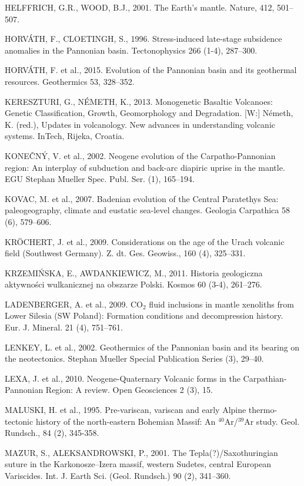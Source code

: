 \documentclass[11.5pt,twoside]{report}
\begin{document}
\begin{multicols}{3}
\uppercase{Helffrich, G.R., Wood, B.J.}, 2001. The Earth's mantle. Nature, 412, 501–507.

\uppercase{Horv\'{A}th, F., Cloetingh, S., 1996.} Stress-induced late-stage subsidence anomalies in the Pannonian basin. Tectonophysics 266 (1-4), 287–300.

\uppercase{Horv\'{A}th, F.} et al., 2015. Evolution of the Pannonian basin and its geothermal resources. Geothermics 53, 328–352. 

\uppercase{Kereszturi, G., N\'{E}meth, K., 2013.} Monogenetic Basaltic Volcanoes: Genetic Classification, Growth, Geomorphology and Degradation. [W:] Németh, K. (red.), Updates in volcanology. New advances in understanding volcanic systems. InTech, Rijeka, Croatia.

\uppercase{Konečný, V.} et al., 2002. Neogene evolution of the Carpatho-Pannonian region: An interplay of subduction and back-arc diapiric uprise in the mantle. EGU Stephan Mueller Spec. Publ. Ser. (1), 165–194.

\uppercase{Kovac, M.} et al., 2007. Badenian evolution of the Central Paratethys Sea: paleogeography, climate and eustatic sea-level changes. Geologia Carpathica 58 (6), 579–606.

\uppercase{Kröchert, J.} et al., 2009. Considerations on the age of the Urach volcanic field (Southwest Germany). Z. dt. Ges. Geowiss., 160 (4), 325–331.

\uppercase{Krzemi\'{N}ska, E., Awdankiewicz, M., 2011.} Historia geologiczna aktywności wulkanicznej na obszarze Polski. Kosmos 60 (3-4), 261–276.

\uppercase{Ladenberger, A.} et al., 2009. CO$_2$ fluid inclusions in mantle xenoliths from Lower Silesia (SW Poland): Formation conditions and decompression history. Eur. J. Mineral. 21 (4), 751–761.

\uppercase{Lenkey, L.} et al., 2002. Geothermics of the Pannonian basin and its bearing on the neotectonics. Stephan Mueller Special Publication Series (3), 29–40.

\uppercase{Lexa, J.} et al., 2010. Neogene-Quaternary Volcanic forms in the Carpathian-Pannonian Region: A review. Open Geosciences 2 (3), 15.

\uppercase{Maluski, H.} et al., 1995. Pre-variscan, variscan and early Alpine thermo-tectonic history of the north-eastern Bohemian Massif: An $^40$Ar/$^39$Ar study. Geol. Rundsch., 84 (2), 345-358.

\uppercase{Mazur, S., Aleksandrowski, P.}, 2001. The Tepla(?)/Saxothuringian suture in the Karkonosze–Izera massif, western Sudetes, central European Variscides. Int. J. Earth Sci. (Geol. Rundsch.) 90 (2), 341–360.


\end{multicols}
\end{document}
